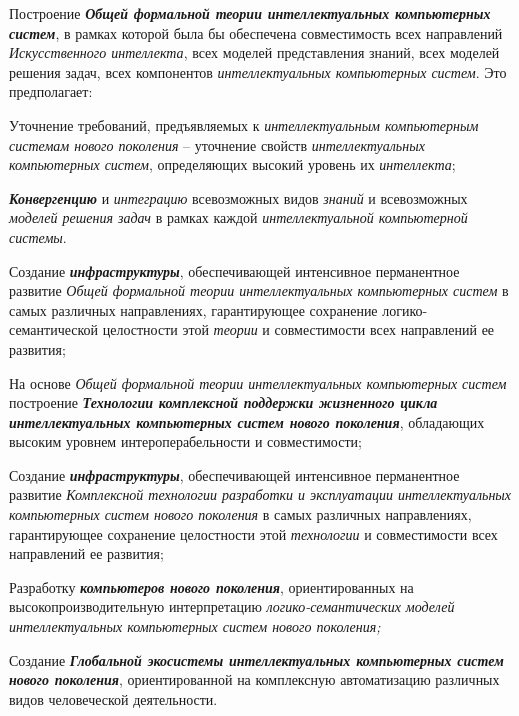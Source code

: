 \begin{textitemize}
	\item
	Построение \textbf{\textit{Общей формальной теории интеллектуальных компьютерных систем}}, в рамках которой была бы обеспечена совместимость всех направлений \textit{Искусственного интеллекта}, всех моделей представления знаний, всех моделей решения задач, всех компонентов \textit{интеллектуальных компьютерных систем}. Это предполагает:
	
	\begin{textitemize}
		\item
		Уточнение требований, предъявляемых к \textit{интеллектуальным компьютерным системам нового поколения} -- уточнение свойств \textit{интеллектуальных компьютерных систем}, определяющих высокий уровень их \textit{интеллекта};
		\item
		\textbf{\textit{Конвергенцию}} и \textit{интеграцию} всевозможных видов \textit{знаний} и всевозможных \textit{моделей решения задач} в рамках каждой \textit{интеллектуальной компьютерной системы}.
	\end{textitemize}
	
	\item
	Создание \textbf{\textit{инфраструктуры}}, обеспечивающей интенсивное перманентное развитие \textit{Общей формальной теории интеллектуальных компьютерных систем} в самых различных направлениях, гарантирующее сохранение логико-семантической целостности этой \textit{теории} и совместимости всех направлений ее развития;
	\item
	На основе \textit{Общей формальной теории интеллектуальных компьютерных систем} построение \textbf{\textit{Технологии комплексной поддержки жизненного цикла интеллектуальных компьютерных систем нового поколения}}, обладающих высоким уровнем интероперабельности и совместимости;
	\item
	Создание \textbf{\textit{инфраструктуры}}, обеспечивающей интенсивное перманентное развитие \textit{Комплексной технологии разработки и эксплуатации интеллектуальных компьютерных систем нового поколения} в самых различных направлениях, гарантирующее сохранение целостности этой \textit{технологии} и совместимости всех направлений ее развития;
	\item
	Разработку \textbf{\textit{компьютеров нового поколения}}, ориентированных на высокопроизводительную интерпретацию \textit{логико-семантических моделей интеллектуальных компьютерных систем нового поколения;}
	\item
	Создание \textbf{\textit{Глобальной экосистемы интеллектуальных компьютерных систем нового поколения}}, ориентированной на комплексную автоматизацию различных видов человеческой деятельности.
\end{textitemize}

